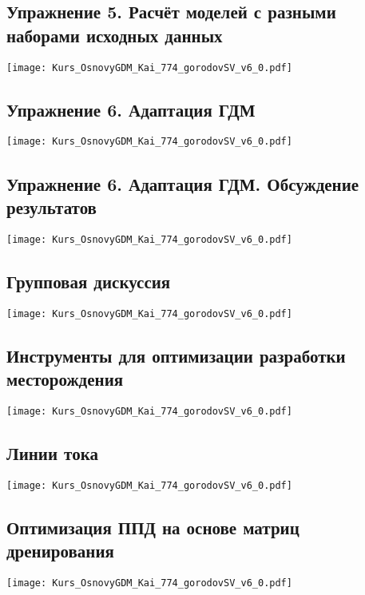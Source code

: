 \documentclass[main.tex]{subfiles}
\begin{document}
\subsection{Упражнение 5. Расчёт моделей с разными наборами исходных данных}

\texttt{[image: Kurs\_OsnovyGDM\_Kai\_774\_gorodovSV\_v6\_0.pdf]}

\subsection{Упражнение 6. Адаптация ГДМ}

\texttt{[image: Kurs\_OsnovyGDM\_Kai\_774\_gorodovSV\_v6\_0.pdf]}

\subsection{Упражнение 6. Адаптация ГДМ. Обсуждение результатов}

\texttt{[image: Kurs\_OsnovyGDM\_Kai\_774\_gorodovSV\_v6\_0.pdf]}

\subsection{Групповая дискуссия}

\texttt{[image: Kurs\_OsnovyGDM\_Kai\_774\_gorodovSV\_v6\_0.pdf]}

\subsection{Инструменты для оптимизации разработки месторождения}

\texttt{[image: Kurs\_OsnovyGDM\_Kai\_774\_gorodovSV\_v6\_0.pdf]}

\subsection{Линии тока}

\texttt{[image: Kurs\_OsnovyGDM\_Kai\_774\_gorodovSV\_v6\_0.pdf]}

\subsection{Оптимизация ППД на основе матриц дренирования}

\texttt{[image: Kurs\_OsnovyGDM\_Kai\_774\_gorodovSV\_v6\_0.pdf]}
\end{document}
